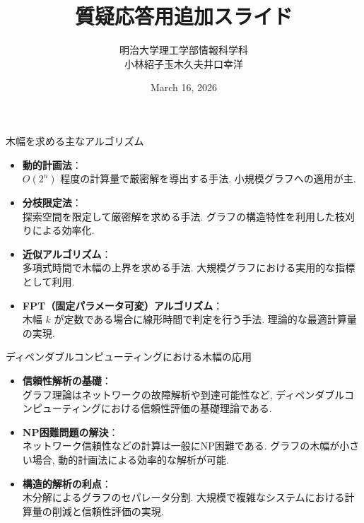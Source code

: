 \documentclass[aspectratio=169]{beamer}
\begin{document}
\title{質疑応答用追加スライド}
\author{明治大学理工学部情報科学科\\ 小林紹子\quad 玉木久夫\quad 井口幸洋} %
\date{March 16, 2026}

\begin{frame}[plain]
  \titlepage
\end{frame}

\begin{frame}{木幅を求める主なアルゴリズム}
\begin{itemize}
  \setlength{\parskip}{0.5em}
    \item \textbf{動的計画法}：\\ $O(2^n)$ 程度の計算量で厳密解を導出する手法. 小規模グラフへの適用が主.
    \item \textbf{分枝限定法}：\\探索空間を限定して厳密解を求める手法. グラフの構造特性を利用した枝刈りによる効率化.
    \item \textbf{近似アルゴリズム}：\\ 多項式時間で木幅の上界を求める手法. 大規模グラフにおける実用的な指標として利用.
    \item \textbf{FPT（固定パラメータ可変）アルゴリズム}：\\木幅 $k$ が定数である場合に線形時間で判定を行う手法. 理論的な最適計算量の実現.
\end{itemize}
\vspace{0.5cm}

\end{frame}

\begin{frame}{ディペンダブルコンピューティングにおける木幅の応用}
\begin{itemize}
   \setlength{\parskip}{0.5em}
    \item \textbf{信頼性解析の基礎}：\\グラフ理論はネットワークの故障解析や到達可能性など, ディペンダブルコンピューティングにおける信頼性評価の基礎理論である.
    \item \textbf{NP困難問題の解決}：\\ネットワーク信頼性などの計算は一般にNP困難である. グラフの木幅が小さい場合, 動的計画法による効率的な解析が可能.
    \item \textbf{構造的解析の利点}：\\木分解によるグラフのセパレータ分割. 大規模で複雑なシステムにおける計算量の削減と信頼性評価の実現.
\end{itemize}
\vspace{0.5cm}

\end{frame}
\end{document}
